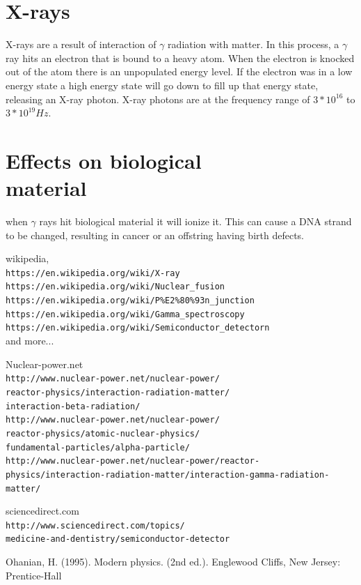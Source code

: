 \documentclass[]{article}
\begin{document}
\section{X-rays}

X-rays are a result of interaction of $\gamma$ radiation with matter. In this process, a $\gamma$ ray hits an electron that is bound to a heavy atom. When the electron is knocked out of the atom there is an unpopulated energy level. If the electron was in a low energy state a high energy state will go down to fill up that energy state, releasing an X-ray photon. X-ray photons are at the frequency range of $3*10^{16}$ to $3*10^{19}Hz$.

\section{Effects on biological \\ material}

when $\gamma$ rays hit biological material it will ionize it. This can cause a DNA strand to be changed, resulting in cancer or an offstring having birth defects.

\begin{thebibliography}{9}
wikipedia,
\\\texttt{https://en.wikipedia.org/wiki/X-ray} \\\texttt{https://en.wikipedia.org/wiki/Nuclear\_fusion} \\\texttt{https://en.wikipedia.org/wiki/P\%E2\%80\%93n\_junction} \\\texttt{https://en.wikipedia.org/wiki/Gamma\_spectroscopy}
\\\texttt{https://en.wikipedia.org/wiki/Semiconductor\_detectorn}\\ and more...


Nuclear-power.net
\\\texttt{http://www.nuclear-power.net/nuclear-power/\\reactor-physics/interaction-radiation-matter/\\interaction-beta-radiation/} \\\texttt{http://www.nuclear-power.net/nuclear-power/\\reactor-physics/atomic-nuclear-physics/\\fundamental-particles/alpha-particle/} \\\texttt{http://www.nuclear-power.net/nuclear-power/reactor-physics/interaction-radiation-matter/interaction-gamma-radiation-matter/}

sciencedirect.com
\\\texttt{http://www.sciencedirect.com/topics/\\medicine-and-dentistry/semiconductor-detector}

Ohanian, H. (1995). Modern physics. (2nd ed.). Englewood Cliffs, New Jersey: Prentice-Hall

\end{thebibliography}
\end{document}
